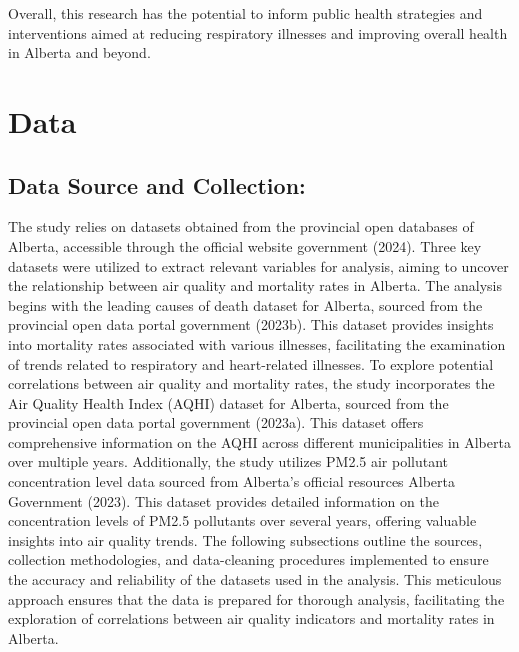 \documentclass[
  letterpaper,
  DIV=11,
  numbers=noendperiod]{scrartcl}
\begin{document}
Overall, this research has the potential to inform public health
strategies and interventions aimed at reducing respiratory illnesses and
improving overall health in Alberta and beyond.

\section{Data}\label{sec-data}

\subsection{Data Source and
Collection:}\label{data-source-and-collection}

The study relies on datasets obtained from the provincial open databases
of Alberta, accessible through the official website government (2024).
Three key datasets were utilized to extract relevant variables for
analysis, aiming to uncover the relationship between air quality and
mortality rates in Alberta. The analysis begins with the leading causes
of death dataset for Alberta, sourced from the provincial open data
portal government (2023b). This dataset provides insights into mortality
rates associated with various illnesses, facilitating the examination of
trends related to respiratory and heart-related illnesses. To explore
potential correlations between air quality and mortality rates, the
study incorporates the Air Quality Health Index (AQHI) dataset for
Alberta, sourced from the provincial open data portal government
(2023a). This dataset offers comprehensive information on the AQHI
across different municipalities in Alberta over multiple years.
Additionally, the study utilizes PM2.5 air pollutant concentration level
data sourced from Alberta's official resources Alberta Government
(2023). This dataset provides detailed information on the concentration
levels of PM2.5 pollutants over several years, offering valuable
insights into air quality trends. The following subsections outline the
sources, collection methodologies, and data-cleaning procedures
implemented to ensure the accuracy and reliability of the datasets used
in the analysis. This meticulous approach ensures that the data is
prepared for thorough analysis, facilitating the exploration of
correlations between air quality indicators and mortality rates in
Alberta.
\end{document}

